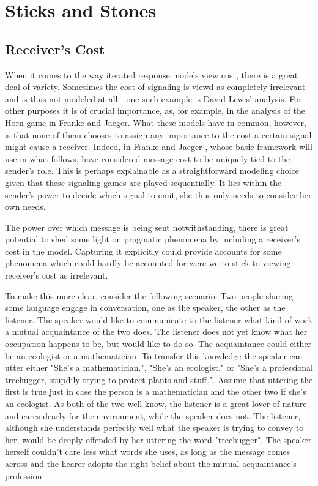 \documentclass[10]{article}
\begin{document}
\section{Sticks and Stones}
\subsection{Receiver's Cost}
When it comes to the way iterated response models view cost, there is a great deal of variety. Sometimes the cost of signaling is viewd as completely irrelevant and is thus not modeled at all - one such example is David Lewis' analysis.  For other purposes it is of crucial importance, as, for example, in the analysis of the Horn game in Franke and Jaeger. What these models have in common, however, is that none of them chooses to assign any importance to the cost a certain signal might cause a receiver. Indeed,  in Franke and Jaeger , whose basic framework will use in what follows, have considered message cost to be uniquely tied to the sender's role. This is perhaps explainable as a straightforward modeling choice given that these signaling games are played sequentially. It lies within the sender's power to decide which signal to emit, she thus only needs to consider her own needs. %

The power over which message is being sent notwithstanding, there is great potential to shed some light on pragmatic phenomena by including a receiver's cost in the model. Capturing it explicitly could provide accounts for some phenomena which could hardly be accounted for were we to stick to viewing receiver's cost as irrelevant.

To make this more clear, consider the following scenario: Two people sharing some language engage in conversation, one as the speaker, the other as the listener. The speaker would like to communicate to the listener what kind of work a mutual acquaintance of the two does. The listener does not yet know what her occupation happens to be, but would like to do so. The acquaintance could either be an ecologist or a mathematician. To transfer this knowledge the speaker can utter either "She's a mathematician.", "She's an ecologist." or "She's a professional treehugger, stupdily trying to protect plants and stuff.". Assume that uttering the first is true just in case the person is a mathematician and the other two if she's an ecologist. As both of the two well know, the listener is a great lover of nature and cares dearly for the environment, while the speaker does not. The listener, although she understands perfectly well what the speaker is trying to convey to her, would be deeply offended by her uttering the word "treehugger". The speaker herself couldn't care less what words she uses, as long as the message comes across and the hearer adopts the right belief about the mutual acquaintance's profession.
\end{document}
